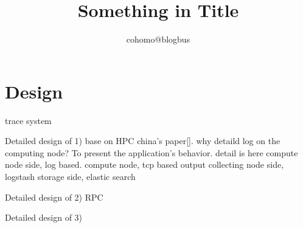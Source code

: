 \documentclass{article}
\begin{document}
\title{Something in Title}

\author{cohomo@blogbus}

\date{}

\maketitle

\fi

\section{Design}

\label{sec:design}

trace system

Detailed design of 1)
base on HPC china's paper[].
why detaild log on the computing node? To present the application's behavior.
detail is here
compute node side, log based.
compute node, tcp based output
collecting node side, logstash
storage side, elastic search

Detailed design of 2)
RPC 

Detailed design of 3)



\ifx\allfiles\undefined
\end{document}
